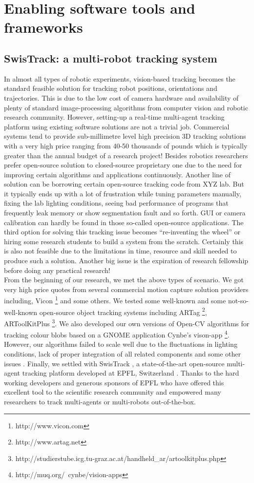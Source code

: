 \section{Enabling software tools and frameworks}
\subsection{SwisTrack: a multi-robot tracking system}
\label{expt-tools:swistrack}
In almost all types of robotic experiments, vision-based tracking becomes the standard feasible solution for tracking robot positions, orientations and trajectories. This is due to the low cost of camera hardware and availability of plenty of standard image-processing algorithms from computer vision and robotic research community. However, setting-up a real-time multi-agent tracking platform using existing software solutions are not a trivial job. Commercial systems tend to provide sub-millimetre level high precision 3D tracking solutions with a very high price ranging from  40-50 thousands of pounds which is typically greater than the annual budget of a research project! Besides robotics researchers prefer open-source solution to closed-source proprietary one due to the need for improving certain algorithms and applications continuously. Another line of solution can be borrowing certain open-source tracking code from XYZ lab. But it typically ends up with a lot of frustration while tuning parameters manually, fixing the lab lighting conditions, seeing bad performance of programs that frequently leak memory or show segmentation fault and so forth. GUI or camera calibration can hardly be found in those so-called open-source applications. The third option for solving this tracking issue becomes ``re-inventing the wheel'' or hiring some research students to build a system from the scratch. Certainly this is also not feasible due to the limitations in time, resource and skill needed to produce such a solution. Another big issue is the expiration of research fellowship before doing any practical research!\\
From the beginning of our research, we met the above types of scenario. We got very high price quotes from several commercial motion capture solution providers including, Vicon \footnote{http://www.vicon.com} and some others. We tested some well-known and some not-so-well-known open-source object tracking systems including ARTag \footnote{http://www.artag.net}, ARToolKitPlus \footnote{http://studierstube.icg.tu-graz.ac.at/handheld\_ar/artoolkitplus.php}. We also developed our own versions of Open-CV algorithms for tracking colour blobs based on a GNOME application Cynbe's vison-app \footnote{http://muq.org/~cynbe/vision-apps}. However, our algorithms failed to scale well due to the fluctuations in lighting conditions, lack of proper integration of all related components and some other issues \cite{Sarker2008}. Finally, we settled with SwisTrack \cite{Lochmatter+2008} , a state-of-the-art open-source multi-agent tracking platform developed at EPFL, Switzerland . Thanks to the hard working developers and generous sponsors of EPFL who have offered this excellent tool to the scientific research community and empowered many researchers to track multi-agents or  multi-robots out-of-the-box.\\
